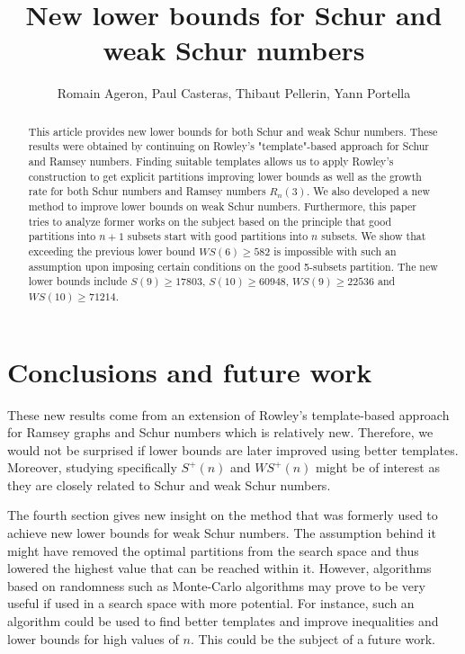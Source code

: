 \documentclass{article}
\title{New lower bounds for Schur and weak Schur numbers}
\author{Romain Ageron, Paul Casteras, Thibaut Pellerin, Yann Portella}
\newtheorem{computational theorem}{Computational Theorem}[section]
\newcommand{\WS}{\mathit{WS}}
\begin{document}
\maketitle

\begin{abstract}

This article provides new lower bounds for both Schur and weak Schur numbers. These results were obtained by continuing on
Rowley's "template"-based approach for Schur and Ramsey numbers. Finding suitable templates allows us to apply Rowley's construction
to get explicit partitions improving lower bounds as well as the growth rate for both Schur numbers and Ramsey numbers \(R_n(3)\).
We also developed a new method to improve lower bounds on weak Schur numbers. Furthermore, this paper tries to analyze former
works on the subject based on the principle that good partitions into \(n+1\) subsets start with good partitions
into \(n\) subsets. We show that exceeding the previous lower bound \(\WS (6) \geqslant 582\) is impossible with such an assumption upon
imposing certain conditions on the good 5-subsets partition. The new lower bounds include \(S(9) \geqslant 17803\), \(S(10) \geqslant 60948\),
\(\WS (9) \geqslant 22536 \) and \(\WS (10) \geqslant 71214 \).

\end{abstract}




% 








\section{Conclusions and future work}

\qquad These new results come from an extension of Rowley's template-based approach for Ramsey graphs and Schur numbers which is relatively new.
Therefore, we would not be surprised if lower bounds are later improved using better templates. Moreover, studying specifically \(S^+(n)\) and
\(\WS^+(n)\) might be of interest as they are closely related to Schur and weak Schur numbers.

\par
The fourth section gives new insight on the method that was formerly used to achieve new lower bounds for weak Schur numbers. The assumption behind it
might have removed the optimal partitions from the search space and thus lowered the highest value that can be reached within it.
However, algorithms based on randomness such as Monte-Carlo algorithms may prove to be very useful if used in a search space with more
potential. For instance, such an algorithm could be used to find better templates and improve inequalities and lower bounds for high values
of \(n\). This could be the subject of a future work.
\end{document}
